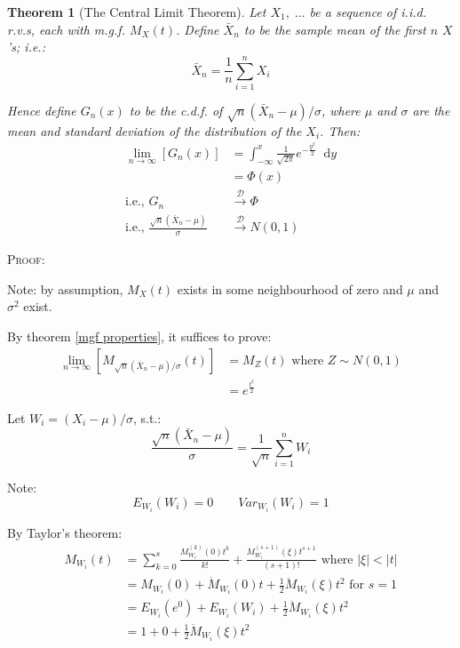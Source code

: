 \documentclass[12pt,a4paper]{article}
\newcommand{\diff}{\;\mathrm{d}}
\newtheorem{thm}{Theorem}[subsection]
\begin{document}
\begin{thm}[The Central Limit Theorem]\vspace{1cm}

Let $X_1,\;\hdots$ be a sequence of i.i.d. r.v.s, each with m.g.f. $M_X(t)$. Define $\bar{X}_n$ to be the sample mean of the first $n$ $X$'s; i.e.:
$$\bar{X}_n = \frac{1}{n}\sum_{i=1}^n X_i$$

Hence define $G_n(x)$ to be the c.d.f. of $\sqrt{n}(\bar{X}_n -\mu)/\sigma$, where $\mu$ and $\sigma$ are the mean and standard deviation of the distribution of the $X_i$. Then:
\begin{align*}
\lim_{n\to\infty}\left[G_n(x)\right] &= \int_{-\infty}^{x}\!\! \frac{1}{\sqrt{2\pi}}e^{-\frac{y^2}{2}}\;\diff y\\
&= \Phi(x)\\
\text{i.e., } G_n &\xrightarrow{\mathscr{D}} \Phi\\
\text{i.e., } \frac{\sqrt{n}\left(\bar{X}_n -\mu\right)}{\sigma} &\xrightarrow{\mathscr{D}} N(0,1)
\end{align*}

\end{thm}

\noindent\textsc{Proof:}\par\vspace{1cm}

Note: by assumption, $M_X(t)$ exists in some neighbourhood of zero and $\mu$ and $\sigma^2$ exist.

By theorem \ref{mgf properties}, it suffices to prove:
\begin{align*}
\lim_{n\to\infty}\left[M_{\sqrt{n}\left(\bar{X}_n -\mu\right)/\sigma}(t)\right] &= M_Z(t) \mbox{ where $Z\sim N(0,1)$}\\
&= e^{\frac{t^2}{2}}
\end{align*}

Let $W_i =\left(X_i-\mu\right)/\sigma$, s.t.:
$$\frac{\sqrt{n}\left(\bar{X}_n-\mu\right)}{\sigma} = \frac{1}{\sqrt{n}}\sum_{i=1}^n W_i$$

Note:
$$E_{W_i}(W_i) = 0 \qquad Var_{W_i}(W_i) = 1$$

By Taylor's theorem:
\begin{align*}
M_{W_i}(t) &= \sum_{k=0}^s \frac{M_{W_i}^{(k)}(0)t^k}{k!} + \frac{M_{W_i}^{(s+1)}\left(\xi\right)t^{s+1}}{(s+1)!} \mbox{ where $\left|\xi\right|<|t|$}\\
&= M_{W_i}(0) + \dot{M}_{W_i}(0)t + \frac{1}{2}\ddot{M}_{W_i}\left(\xi\right)t^2 \mbox{ for $s=1$}\\
&= E_{W_i}\left(e^0\right) + E_{W_i}\left(W_i\right) + \frac{1}{2}\ddot{M}_{W_i}\left(\xi\right)t^2\\
&= 1 + 0 + \frac{1}{2}\ddot{M}_{W_i}\left(\xi\right)t^2
\end{align*}
\end{document}
